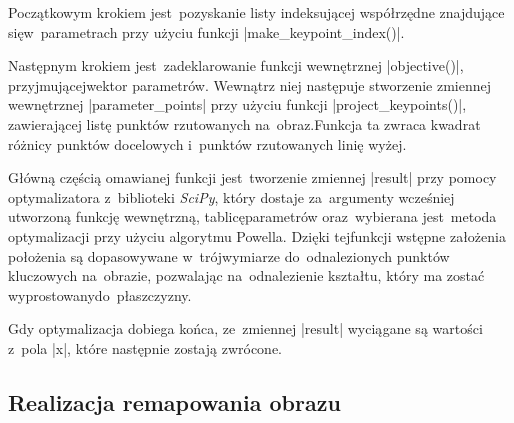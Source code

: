 Początkowym krokiem jest~pozyskanie listy indeksującej współrzędne znajdujące się\linebreak w~parametrach przy użyciu funkcji \pyth|make_keypoint_index()|. 

Następnym krokiem jest~zadeklarowanie funkcji wewnętrznej \pyth|objective()|, przyjmującej\linebreak wektor parametrów. Wewnątrz niej następuje stworzenie zmiennej wewnętrznej \pyth|parameter_points| przy użyciu funkcji \pyth|project_keypoints()|, zawierającej listę punktów rzutowanych na~obraz.\linebreak Funkcja ta zwraca kwadrat różnicy punktów docelowych i~punktów rzutowanych linię wyżej.

Główną częścią omawianej funkcji jest~tworzenie zmiennej \pyth|result| przy pomocy optymalizatora z~biblioteki \textit{SciPy}, który dostaje za~argumenty wcześniej utworzoną funkcję wewnętrzną, tablicę\linebreak parametrów oraz~wybierana jest~metoda optymalizacji przy użyciu algorytmu Powella. Dzięki tej\linebreak funkcji wstępne założenia położenia są dopasowywane w~trójwymiarze do~odnalezionych punktów kluczowych na~obrazie, pozwalając na~odnalezienie kształtu, który ma zostać wyprostowany\linebreak do~płaszczyzny. 

Gdy optymalizacja dobiega końca, ze~zmiennej \pyth|result| wyciągane są wartości z~pola \pyth|x|, które następnie zostają zwrócone.

\newpage

\subsection{Realizacja remapowania obrazu}


